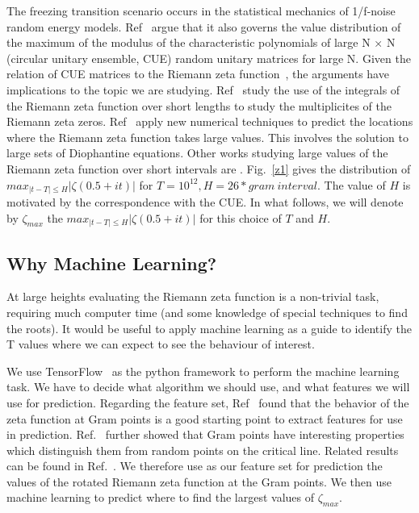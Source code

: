 \documentclass[twoside]{article}
\begin{document}
The freezing transition scenario occurs in the statistical mechanics of 1/f-noise random energy models. Ref~\cite{FK} argue that it  also governs the value distribution of the maximum of the modulus of the characteristic polynomials  of large N × N (circular unitary ensemble, CUE) random unitary  matrices for large N.  Given the relation of CUE matrices to the Riemann zeta function~\cite{oscue}, the arguments have implications to the topic we are studying. 
Ref~\cite{Ivic} study the use of the integrals of the Riemann zeta function over short lengths to study
the multiplicites of the Riemann zeta zeros.
Ref~\cite{Tihanyi} apply new numerical techniques to predict the locations where the Riemann zeta
function takes large values. This involves the solution to large sets of Diophantine equations.
Other works studying large values of the Riemann zeta function over short intervals are \cite{Feng, FTH}. Fig.~\ref{z1} gives the distribution of $max_{|t-T| \le H}| \zeta ( 0.5+it ) |$ for $T=10^{12}, H=26*gram~interval$.  The value of $H$ is motivated by the correspondence with the CUE. In what follows, we will denote by $\zeta_{max}$ the  $max_{|t-T| \le H}| \zeta ( 0.5+it ) |$ for this choice of $T$ and $H$.


\subsection{\label{secwhy}Why Machine Learning?}

At large heights evaluating the Riemann zeta function  is a non-trivial task, requiring much computer time 
(and some knowledge of special techniques to find the roots).  It would be useful to apply
machine learning
as a guide to identify the T values where we can expect to see the behaviour of interest.

We use TensorFlow~\cite{FrancoisChollet 2021} as the python framework to perform the machine learning 
task. We have to  decide what algorithm we should use, and what features we will use for prediction.
Regarding the feature set, 
Ref~\cite{osneural} found that the behavior of the zeta function at Gram points 
is a good starting point to extract features for use in prediction. 
Ref.~\cite{Shanker 2018a} further showed that Gram points have interesting properties 
which distinguish them from random points on the critical line. 
Related  results can be found in Ref.~\cite{os6, Shanker 2018b,Shanker 2020}. We therefore
use as our feature set for prediction the values of the rotated Riemann zeta function at the Gram points.
We then use machine learning to predict where to find the largest values of $\zeta_{max}$.
\end{document}
